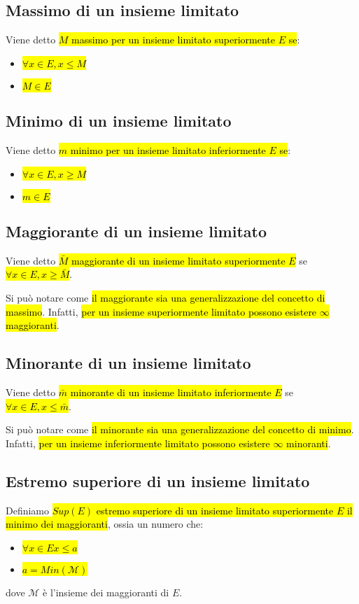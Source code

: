 \subsection{Massimo di un insieme limitato}
Viene detto \hl{$M$ massimo per un insieme limitato superiormente $E$ se}:
\begin{itemize}
    \item \hl{$\forall x \in E, x \leq M$}
    \item \hl{$M \in E$}
\end{itemize}

\subsection{Minimo di un insieme limitato}
Viene detto \hl{$m$ minimo per un insieme limitato inferiormente $E$ se}:
\begin{itemize}
    \item \hl{$\forall x \in E, x \geq M$}
    \item \hl{$m \in E$}
\end{itemize}

\subsection{Maggiorante di un insieme limitato}
Viene detto \hl{$\bar{M}$ maggiorante di un insieme limitato superiormente $E$}
se \hl{$\forall x \in E, x \geq \bar{M}$}.

Si può notare come \hl{il maggiorante sia una generalizzazione del concetto di 
massimo}. Infatti, \hl{per un insieme superiormente limitato possono esistere 
$\infty$ maggioranti}.

\subsection{Minorante di un insieme limitato}
Viene detto \hl{$\bar{m}$ minorante di un insieme limitato inferiormente $E$}
se \hl{$\forall x \in E, x \leq \bar{m}$}.

Si può notare come \hl{il minorante sia una generalizzazione del concetto di 
minimo}. Infatti, \hl{per un insieme inferiormente limitato possono esistere 
$\infty$ minoranti}.

\subsection{Estremo superiore di un insieme limitato}
Definiamo \hl{$Sup(E)$ estremo superiore di un insieme limitato superiormente $E$
il minimo dei maggioranti}, ossia un numero che:
\begin{itemize}
    \item \hl{$\forall x \in E x \leq a$}
    \item \hl{$a = Min(\mathcal{M})$} 
\end{itemize}
dove $\mathcal{M}$ è l'insieme dei maggioranti di $E$.

